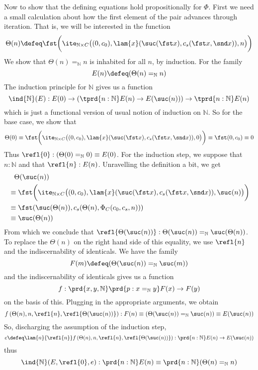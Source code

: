 Now to show that the defining equations hold propositionally for $\Phi$.  First
we need a small calculation about how the first element of the pair advances through
iteration.  That is, we will be interested in the function
\[
  \Theta(n) \defeq
  \fst\bigg(
    \ite_{\mathbb{N} \times C}\big(
    (0, c_{0}),
    \lam{x}(\suc(\fst x), c_{s}(\fst x, \snd x)),
    n
    \big)
  \bigg)
\]
We show that $\Theta(n) =_{\mathbb{N}} n$ is inhabited for all $n$, by
induction.  For the family 
\[
  E(n) \defeq (\Theta(n) =_{\mathbb{N}} n)
\]
The induction principle for $\mathbb{N}$ gives us a function
\[
  \ind{\mathbb{N}}(E) :
  E(0) \to \left(\tprd{n:\mathbb{N}} E(n) \to E(\suc(n))\right) \to
  \tprd{n:\mathbb{N}} E(n)
\]
which is just a functional version of usual notion of induction on
$\mathbb{N}$.  So for the base case, we show that
\[
  \Theta(0)
  \equiv
  \fst\bigg(
    \ite_{\mathbb{N} \times C}\big(
    (0, c_{0}),
    \lam{x}(\suc(\fst x), c_{s}(\fst x, \snd x)),
    0
    \big)
  \bigg)
  \equiv
  \fst(0, c_{0})
  \equiv 0
\]
Thus $\refl{0} : (\Theta(0) =_{\mathbb{N}} 0) \equiv E(0)$.  For the induction
step, we suppose that $n : \mathbb{N}$ and that $\refl{n} : E(n)$.  Unravelling the
definition a bit, we get
\begin{align*}
  &\phantom{\equiv}\Theta(\suc(n))
  \\&\equiv
  \fst\bigg(
    \ite_{\mathbb{N} \times C}\big(
    (0, c_{0}),
    \lam{x}(\suc(\fst x), c_{s}(\fst x, \snd x)),
    \suc(n)
    \big)
  \bigg)
  \\&\equiv
  \fst(\suc(\Theta(n)), c_{s}(\Theta(n), \Phi_{C}(c_{0}, c_{s}, n)))
  \\&\equiv
  \suc(\Theta(n))
\end{align*}
From which we conclude that $\refl{\Theta(\suc(n))} : \Theta(\suc(n))
=_{\mathbb{N}} \suc(\Theta(n))$.  To replace the $\Theta(n)$ on the right hand
side of this equality, we use $\refl{n}$ and the indiscernability of
identicals.  We have the family
\[
  F(m) \defeq (\Theta(\suc(n)) =_{\mathbb{N}} \suc(m))
\]
and the indiscernability of identicals gives us a function 
\[
  f : \prd{x, y, \mathbb{N}}\prd{p : x =_{\mathbb{N}} y} F(x) \to F(y)
\]
on the basis of this.  Plugging in the appropriate arguments, we obtain
\[
  f\left(\Theta(n), n, \refl{n}, \refl{\Theta(\suc(n))}\right) : F(n) \equiv
  (\Theta(\suc(n)) =_{\mathbb{N}} \suc(n))
  \equiv E(\suc(n))
\]
So, discharging the assumption of the induction step,
\[
  e \defeq \lam{n}{\refl{n}}f\left(\Theta(n), n, \refl{n}, \refl{\Theta(\suc(n))}\right)
  :
  \prd{n:\mathbb{N}}E(n) \to E(\suc(n))
\]
thus
\[
  \ind{\mathbb{N}}(E, \refl{0}, e) 
  : 
  \prd{n:\mathbb{N}} E(n)
  \equiv
  \prd{n:\mathbb{N}} (\Theta(n) =_{\mathbb{N}} n)
\]

